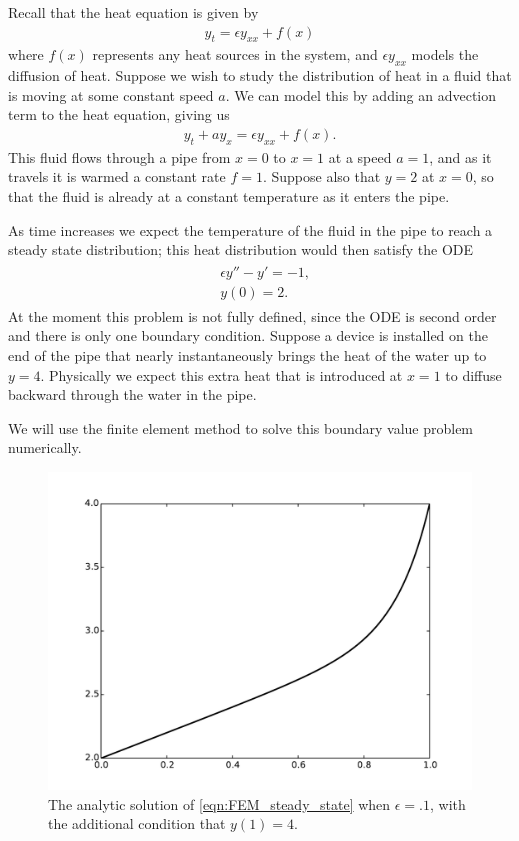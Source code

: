 \label{lab:FEM}
Recall that the heat equation is given by
\begin{align*}
y_t = \epsilon y_{xx} + f(x) %
\end{align*}
where $f(x)$ represents any heat sources in the system, and $\epsilon y_{xx}$ models the diffusion of heat.
Suppose we wish to study the distribution of heat in a fluid that is moving at some constant speed $a$.
We can model this by adding an advection term to the heat equation, giving us
\begin{align*}
y_t + ay_x = \epsilon y_{xx} + f(x).
\end{align*}
This fluid flows through a pipe from $x = 0$ to $x = 1$ at a speed $a = 1$, and as it travels it is warmed a constant rate $f= 1$.
Suppose also that $y = 2$ at $x = 0$, so that the fluid is already at a constant temperature as it enters the pipe.

As time increases we expect the temperature of the fluid in the pipe to reach a steady state distribution; this heat distribution would then satisfy the ODE
\begin{align}
\begin{split}
&{ } \epsilon y'' - y' = -1,\\
&{ } y(0) = 2.
\end{split}\label{eqn:FEM_steady_state}
\end{align}
At the moment this problem is not fully defined, since the ODE is second order and there is only one boundary condition.
Suppose a device is installed on the end of the pipe that nearly instantaneously brings the heat of the water up to $y = 4$.
Physically we expect this extra heat that is introduced at $x = 1$ to diffuse backward through the water in the pipe.

We will use the finite element method to solve this boundary value problem numerically.

\begin{figure}[ht]
\centering
\includegraphics[width=\textwidth]{FEM_solution.pdf}
\caption{The analytic solution of \eqref{eqn:FEM_steady_state} when $\epsilon = .1$, with the additional condition that $y(1) = 4$.}
\label{fig:FEM_analytic_solution}
\end{figure}

